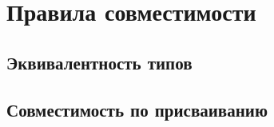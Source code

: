 \hypertarget{compat}{%
\section{Правила совместимости}\label{compat:chapter}}

\hypertarget{equal-types}{%
\subsection{Эквивалентность типов}\label{compat:equal-types}}

\hypertarget{compat-assign}{%
\subsection{Совместимость по присваиванию}\label{compat:assign}}


